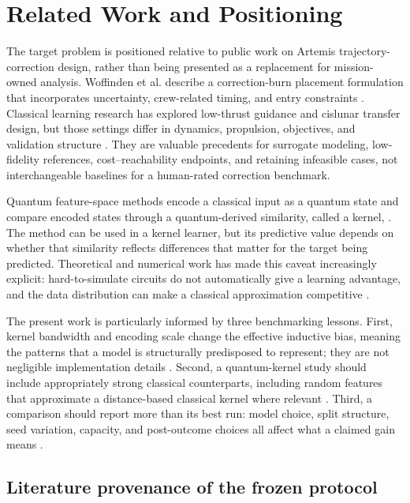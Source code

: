 \section{Related Work and Positioning}

The target problem is positioned relative to public work on Artemis
trajectory-correction design, rather than being presented as a replacement for
mission-owned analysis. Woffinden et al. describe a correction-burn placement
formulation that incorporates uncertainty, crew-related timing, and entry
constraints \cite{woffinden2023}. Classical learning research has explored
low-thrust guidance and cislunar transfer design, but those settings differ in
dynamics, propulsion, objectives, and validation structure
\cite{zavoli2020,sullivan2021,izzo2021,steffen2025,xie2022,zhang2025}. They
are valuable precedents for surrogate modeling, low-fidelity references,
cost--reachability endpoints, and retaining infeasible cases, not
interchangeable baselines for a human-rated correction benchmark.

Quantum feature-space methods encode a classical input as a quantum state and
compare encoded states through a quantum-derived similarity, called a kernel,
\cite{schuld2019,havlicek2019}. The method can be used in a kernel learner,
but its predictive value depends on whether that similarity reflects differences
that matter for the target being predicted. Theoretical and numerical work
has made this caveat increasingly explicit: hard-to-simulate circuits do not
automatically give a learning advantage, and the data distribution can make a
classical approximation competitive \cite{huang2021,sweke2025}.

The present work is particularly informed by three benchmarking lessons. First,
kernel bandwidth and encoding scale change the effective inductive bias, meaning
the patterns that a model is structurally predisposed to represent; they are not
negligible implementation details \cite{shaydulin2022}. Second, a
quantum-kernel study should include appropriately strong classical
counterparts, including random features that approximate a distance-based
classical kernel where relevant
\cite{otten2020,rahimi2007,sweke2025}. Third, a comparison should report more than its
best run: model choice, split structure, seed variation, capacity, and
post-outcome choices all affect what a claimed gain means
\cite{bowles2024,schnabel2024,pernot2020}.

\subsection{Literature provenance of the frozen protocol}

